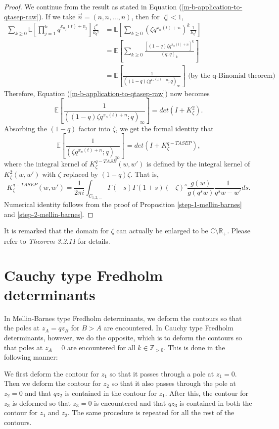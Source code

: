 \begin{proof}
We continue from the result as stated in Equation (\ref{m-b-application-to-qtasep-raw}). If we take $\vec{n} = (n,n,\dots,n)$, then for $|\zeta| < 1$,
\begin{align*}
\sum_{k \ge 0} \mathbb{E} \left[ \prod_{j=1}^k q^{x_{n_j}(t)+n_j} \right] \frac{\zeta^k}{k_q!} &= \mathbb{E} \left[ \sum_{k \ge 0} (\zeta q^{x_n(t) + n})^k \frac{1}{k_q!} \right]\\
&= \mathbb{E} \left[ \sum_{k \ge 0} \frac{[(1-q) \zeta q^{x_n(t) + n}]^k}{(q;q)_k} \right]\\
&= \mathbb{E} \left[ \frac{1}{( (1-q) \zeta q^{x_n(t) + n} ;q)_{\infty}} \right] \text{ (by the q-Binomial theorem) }
\end{align*}
Therefore, Equation (\ref{m-b-application-to-qtasep-raw}) now becomes $$\mathbb{E} \left[ \frac{1}{( (1-q) \zeta q^{x_n(t) + n} ;q)_{\infty}} \right] = det(I+K^2_{\zeta}).$$
Absorbing the $(1-q)$ factor into $\zeta$, we get the formal identity that $$\mathbb{E} \left[ \frac{1}{(\zeta q^{x_n(t)+n}; q)_{\infty}} \right] = det(I+K_{\zeta}^{q-TASEP}),$$ where the integral kernel of $K^{q-TASE}_{\zeta} (w,w')$ is defined by the integral kernel of $K^2_{\zeta}(w,w')$ with $\zeta$ replaced by $(1-q)\zeta$. That is, $$K_{\zeta}^{q-TASEP} (w, w') = \frac{1}{2 \pi i} \int_{C_{1,2, \dots}} \Gamma(-s) \Gamma(1+s) (-\zeta)^s \frac{g(w)}{g(q^s w)} \frac{1}{q^s w - w'}ds.$$
Numerical identity follows from the proof of Proposition \ref{step-1-mellin-barnes} and \ref{step-2-mellin-barnes}.
\end{proof}

\begin{remark}
It is remarked that the domain for $\zeta$ can actually be enlarged to be $\mathbb{C} \setminus \mathbb{R}_+$. Please refer to \cite{macdonald2014} \textit{Theorem 3.2.11} for details. 
\end{remark}

\section{Cauchy type Fredholm determinants}
In Mellin-Barnes type Fredholm determinants, we deform the contours so that the poles at $z_A = qz_B$ for $B > A$ are encountered. In Cauchy type Fredholm determinants, however, we do the opposite, which is to deform the contours so that poles at $z_A = 0$ are encountered for all $k \in \mathbb{Z}_{>0}$. This is done in the following manner:

We first deform the contour for $z_1$ so that it passes through a pole at $z_1 = 0$. Then we deform the contour for $z_2$ so that it also passes through the pole at $z_2 = 0$ and that $qz_2$ is contained in the contour for $z_1$. After this, the contour for $z_3$ is deformed so that $z_3 = 0$ is encountered and that $qz_3$ is contained in both the contour for $z_1$ and $z_2$. The same procedure is repeated for all the rest of the contours.


